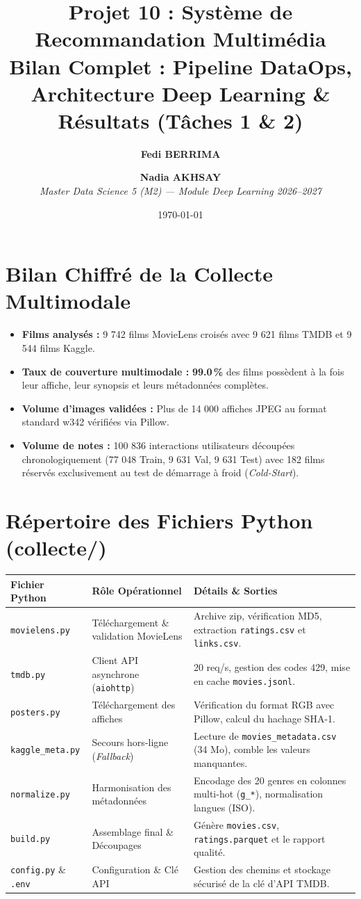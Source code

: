 \documentclass[10pt,a4paper]{article}
\title{\vspace{-1.2cm}\textbf{\Large Projet 10 : Système de Recommandation Multimédia}\\
\large Bilan Complet : Pipeline DataOps, Architecture Deep Learning \& Résultats (Tâches 1 \& 2)}
\author{\textbf{Fedi BERRIMA} \and \textbf{Nadia AKHSAY}\\
\textit{Master Data Science 5 (M2) --- Module Deep Learning 2026--2027}}
\date{\vspace{-0.5cm}\today}
\begin{document}
\maketitle

\section{Bilan Chiffré de la Collecte Multimodale}
\begin{itemize}
    \item \textbf{Films analysés :} 9 742 films MovieLens croisés avec 9 621 films TMDB et 9 544 films Kaggle.
    \item \textbf{Taux de couverture multimodale :} \textbf{99.0\,\%} des films possèdent à la fois leur affiche, leur synopsis et leurs métadonnées complètes.
    \item \textbf{Volume d'images validées :} Plus de 14 000 affiches JPEG au format standard w342 vérifiées via Pillow.
    \item \textbf{Volume de notes :} 100 836 interactions utilisateurs découpées chronologiquement (77 048 Train, 9 631 Val, 9 631 Test) avec 182 films réservés exclusivement au test de démarrage à froid (\textit{Cold-Start}).
\end{itemize}

\section{Répertoire des Fichiers Python (collecte/)}
\begin{table}[h]
\centering
\small
\begin{tabular}{@{}lp{5.5cm}p{7cm}@{}}
\toprule
\textbf{Fichier Python} & \textbf{Rôle Opérationnel} & \textbf{Détails \& Sorties} \\ \midrule
\texttt{movielens.py} & Téléchargement \& validation MovieLens & Archive zip, vérification MD5, extraction \texttt{ratings.csv} et \texttt{links.csv}. \\
\texttt{tmdb.py} & Client API asynchrone (\texttt{aiohttp}) & 20 req/s, gestion des codes 429, mise en cache \texttt{movies.jsonl}. \\
\texttt{posters.py} & Téléchargement des affiches & Vérification du format RGB avec Pillow, calcul du hachage SHA-1. \\
\texttt{kaggle\_meta.py} & Secours hors-ligne (\textit{Fallback}) & Lecture de \texttt{movies\_metadata.csv} (34 Mo), comble les valeurs manquantes. \\
\texttt{normalize.py} & Harmonisation des métadonnées & Encodage des 20 genres en colonnes multi-hot (\texttt{g\_*}), normalisation langues (ISO). \\
\texttt{build.py} & Assemblage final \& Découpages & Génère \texttt{movies.csv}, \texttt{ratings.parquet} et le rapport qualité. \\
\texttt{config.py} \& \texttt{.env} & Configuration \& Clé API & Gestion des chemins et stockage sécurisé de la clé d'API TMDB. \\ \bottomrule
\end{tabular}
\end{table}
\end{document}
